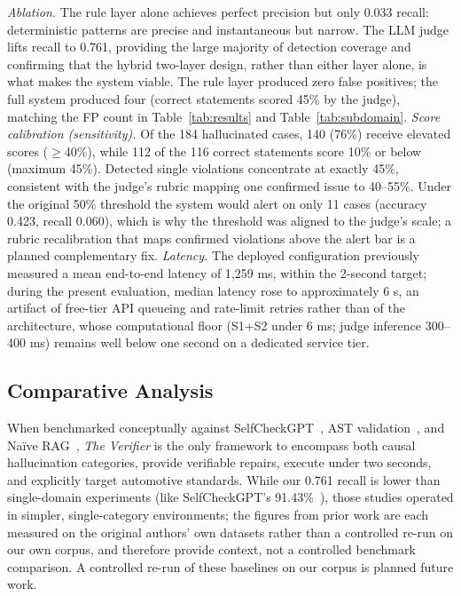\documentclass[conference,a4paper]{IEEEtran}
\begin{document}
\emph{Ablation.} The rule layer alone achieves perfect precision but only 0.033 recall: deterministic patterns are precise and instantaneous but narrow. The LLM judge lifts recall to 0.761, providing the large majority of detection coverage and confirming that the hybrid two-layer design, rather than either layer alone, is what makes the system viable. The rule layer produced zero false positives; the full system produced four (correct statements scored 45\% by the judge), matching the FP count in Table~\ref{tab:results} and Table~\ref{tab:subdomain}.
\emph{Score calibration (sensitivity).} Of the 184 hallucinated cases, 140 (76\%) receive elevated scores ($\ge$40\%), while 112 of the 116 correct statements score 10\% or below (maximum 45\%). Detected single violations concentrate at exactly 45\%, consistent with the judge's rubric mapping one confirmed issue to 40--55\%. Under the original 50\% threshold the system would alert on only 11 cases (accuracy 0.423, recall 0.060), which is why the threshold was aligned to the judge's scale; a rubric recalibration that maps confirmed violations above the alert bar is a planned complementary fix.
\emph{Latency.} The deployed configuration previously measured a mean end-to-end latency of 1{,}259 ms, within the 2-second target; during the present evaluation, median latency rose to approximately 6 s, an artifact of free-tier API queueing and rate-limit retries rather than of the architecture, whose computational floor (S1+S2 under 6 ms; judge inference 300--400 ms) remains well below one second on a dedicated service tier.
\subsection{Comparative Analysis}
When benchmarked conceptually against SelfCheckGPT~\cite{ref7,ref8}, AST validation~\cite{ref9}, and Na\"ive RAG~\cite{ref11}, \textit{The Verifier} is the only framework to encompass both causal hallucination categories, provide verifiable repairs, execute under two seconds, and explicitly target automotive standards. While our 0.761 recall is lower than single-domain experiments (like SelfCheckGPT's 91.43\%~\cite{ref8}), those studies operated in simpler, single-category environments; the figures from prior work are each measured on the original authors' own datasets rather than a controlled re-run on our own corpus, and therefore provide context, not a controlled benchmark comparison. A controlled re-run of these baselines on our corpus is planned future work.
\end{document}
